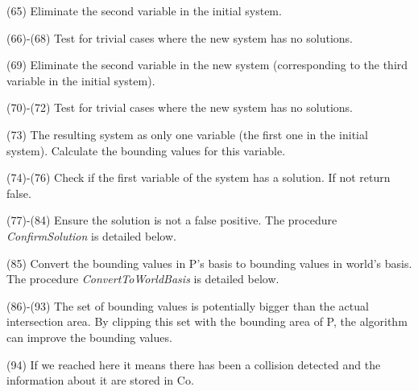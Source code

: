 \documentclass[12pt, a4paper]{article}
\begin{document}
(65) Eliminate the second variable in the initial system.

(66)-(68) Test for trivial cases where the new system has no solutions.

(69) Eliminate the second variable in the new system (corresponding to the third variable in the initial system).

(70)-(72) Test for trivial cases where the new system has no solutions.

(73) The resulting system as only one variable (the first one in the initial system). Calculate the bounding values for this variable.

(74)-(76) Check if the first variable of the system has a solution. If not return false.

(77)-(84) Ensure the solution is not a false positive. The procedure {\em ConfirmSolution} is detailed below.

(85) Convert the bounding values in P's basis to bounding values in world's basis. The procedure {\em ConvertToWorldBasis} is detailed below.

(86)-(93) The set of bounding values is potentially bigger than the actual intersection area. By clipping this set with the bounding area of P, the algorithm can improve the bounding values.

(94) If we reached here it means there has been a collision detected and the information about it are stored in Co.\\
\end{document}
